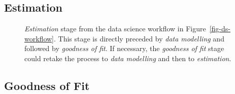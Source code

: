 \documentclass[
  letterpaper,
  DIV=11,
  numbers=noendperiod]{scrreprt}
\begin{document}
\subsection{Estimation}\label{sec-ds-workflow-estimation}

\begin{figure}


\caption{\label{fig-ds-workflow-estimation}\emph{Estimation} stage from
the data science workflow in Figure~\ref{fig-ds-workflow}. This stage is
directly preceded by \emph{data modelling} and followed by
\emph{goodness of fit}. If necessary, the \emph{goodness of fit} stage
could retake the process to \emph{data modelling} and then to
\emph{estimation}.}

\end{figure}%

\subsection{Goodness of Fit}\label{sec-ds-workflow-goodness-of-it}
\end{document}
